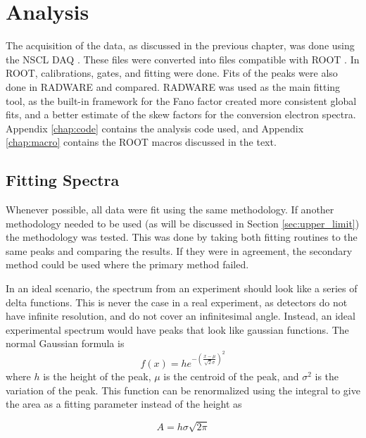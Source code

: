 \chapter{Analysis}
\label{ch:analysis}

The acquisition of the data, as discussed in the previous chapter, was done using the NSCL DAQ \citep{nscl:_daq, prokop14:_nsclddas}. These files were converted into files compatible with ROOT \citep{brun97:_root}. In ROOT, calibrations, gates, and fitting were done. Fits of the peaks were also done in RADWARE \citep{radford00:_radware} and compared. RADWARE was used as the main fitting tool, as the built-in framework for the Fano factor \citep{fano47:_factor} created more consistent global fits, and a better estimate of the skew factors for the conversion electron spectra. Appendix \ref{chap:code} contains the analysis code used, and Appendix \ref{chap:macro} contains the ROOT macros discussed in the text.

\section{Fitting Spectra}
\label{sec:fitting}

Whenever possible, all data were fit using the same methodology. If another methodology needed to be used (as will be discussed in Section \ref{sec:upper_limit}) the methodology was tested. This was done by taking both fitting routines to the same peaks and comparing the results. If they were in agreement, the secondary method could be used where the primary method failed.

In an ideal scenario, the spectrum from an experiment should look like a series of delta functions. This is never the case in a real experiment, as detectors do not have infinite resolution, and do not cover an infinitesimal angle. Instead, an ideal experimental spectrum would have peaks that look like gaussian functions. The normal Gaussian formula is 
\begin{equation}
    f(x) = he^{-\left(\frac{x-\mu}{\sqrt{2}\sigma}\right)^2}
    \label{eq:gaus}
\end{equation}
where $h$ is the height of the peak, $\mu$ is the centroid of the peak, and $\sigma^2$ is the variation of the peak. This function can be renormalized using the integral to give the area as a fitting parameter instead of the height as 

\begin{equation}
    A = h\sigma\sqrt{2\pi}
\end{equation}

